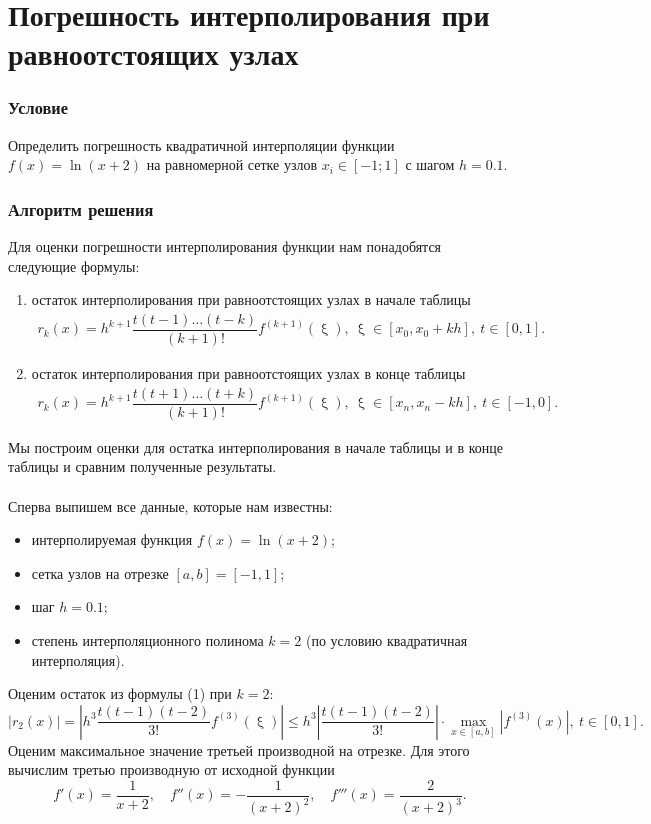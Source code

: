\documentclass[a4paper, 12pt]{article}
\renewcommand{\leq}{\leqslant}
\renewcommand{\xi}{\upxi}
\begin{document}
	\section*{Погрешность интерполирования при равноотстоящих узлах}
	\subsubsection*{Условие}
	Определить погрешность квадратичной интерполяции функции $f(x) = \ln(x+2)$ на равномерной сетке узлов $x_i \in [-1; 1]$ с шагом $h = 0.1$.
	\subsubsection*{Алгоритм решения}
	Для оценки погрешности интерполирования функции нам понадобятся следующие формулы:
	\begin{enumerate}
		\item остаток интерполирования при равноотстоящих узлах в начале таблицы \begin{eqnarray}
			r_k(x) =h^{k+1} \dfrac{t(t-1)\ldots (t-k)}{(k+1)!}f^{(k+1)}(\xi),\ \xi \in [x_0, x_0 + kh],\ t\in [0,1].
		\end{eqnarray}
		\item остаток интерполирования при равноотстоящих узлах в конце таблицы
		\begin{eqnarray}
			r_k(x) = h^{k+1}\dfrac{t(t+1)\ldots (t+k)}{(k+1)!}f^{(k+1)}(\xi),\ \xi \in [x_n, x_{n}-kh],\ t\in [-1,0].
		\end{eqnarray}
	\end{enumerate}
	Мы построим оценки для остатка интерполирования в начале таблицы и в конце таблицы и сравним полученные результаты.\\\\
	Сперва выпишем все данные, которые нам известны:\begin{itemize}
		\item интерполируемая функция $f(x) = \ln(x+2)$;
		\item сетка узлов на отрезке $[a,b] = [-1, 1]$;
		\item шаг $h = 0.1$;
		\item степень интерполяционного полинома $k=2$ (по условию квадратичная интерполяция).
	\end{itemize}
	Оценим остаток из формулы (1) при $k=2$:
	$$|r_2(x)| =\left|h^{3} \dfrac{t(t-1)(t-2)}{3!}f^{(3)}(\xi)\right|\leq h^{3}\left|\dfrac{t(t-1)(t-2)}{3!}\right|\cdot \underset{x\in[a,b]}{\max}|f^{(3)}(x)|,\ t\in [0,1].$$
	Оценим максимальное значение третьей производной на отрезке. Для этого вычислим третью производную от исходной функции $$f'(x) = \dfrac{1}{x+2},\quad f''(x) = -\dfrac{1}{(x+2)^2},\quad f'''(x) = \dfrac{2}{(x+2)^3}.$$
\end{document}
